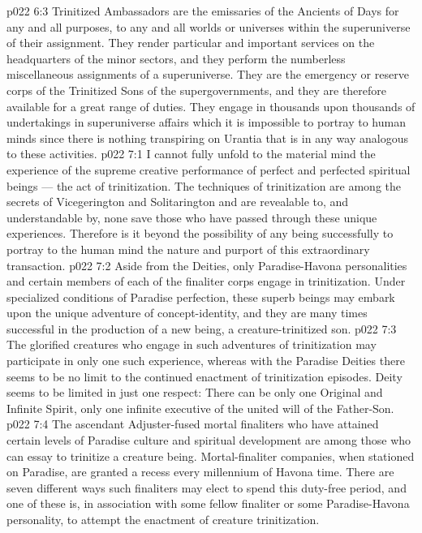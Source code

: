 \vs p022 6:3 Trinitized Ambassadors are the emissaries of the Ancients of Days for any and all purposes, to any and all worlds or universes within the superuniverse of their assignment. They render particular and important services on the headquarters of the minor sectors, and they perform the numberless miscellaneous assignments of a superuniverse. They are the emergency or reserve corps of the Trinitized Sons of the supergovernments, and they are therefore available for a great range of duties. They engage in thousands upon thousands of undertakings in superuniverse affairs which it is impossible to portray to human minds since there is nothing transpiring on Urantia that is in any way analogous to these activities.
\vs p022 7:1 I cannot fully unfold to the material mind the experience of the supreme creative performance of perfect and perfected spiritual beings --- the act of trinitization. The techniques of trinitization are among the secrets of Vicegerington and Solitarington and are revealable to, and understandable by, none save those who have passed through these unique experiences. Therefore is it beyond the possibility of any being successfully to portray to the human mind the nature and purport of this extraordinary transaction.
\vs p022 7:2 Aside from the Deities, only Paradise\hyp{}Havona personalities and certain members of each of the finaliter corps engage in trinitization. Under specialized conditions of Paradise perfection, these superb beings may embark upon the unique adventure of concept\hyp{}identity, and they are many times successful in the production of a new being, a creature\hyp{}trinitized son.
\vs p022 7:3 The glorified creatures who engage in such adventures of trinitization may participate in only one such experience, whereas with the Paradise Deities there seems to be no limit to the continued enactment of trinitization episodes. Deity seems to be limited in just one respect: There can be only one Original and Infinite Spirit, only one infinite executive of the united will of the Father\hyp{}Son.
\vs p022 7:4 The ascendant Adjuster\hyp{}fused mortal finaliters who have attained certain levels of Paradise culture and spiritual development are among those who can essay to trinitize a creature being. Mortal\hyp{}finaliter companies, when stationed on Paradise, are granted a recess every millennium of Havona time. There are seven different ways such finaliters may elect to spend this duty\hyp{}free period, and one of these is, in association with some fellow finaliter or some Paradise\hyp{}Havona personality, to attempt the enactment of creature trinitization.

